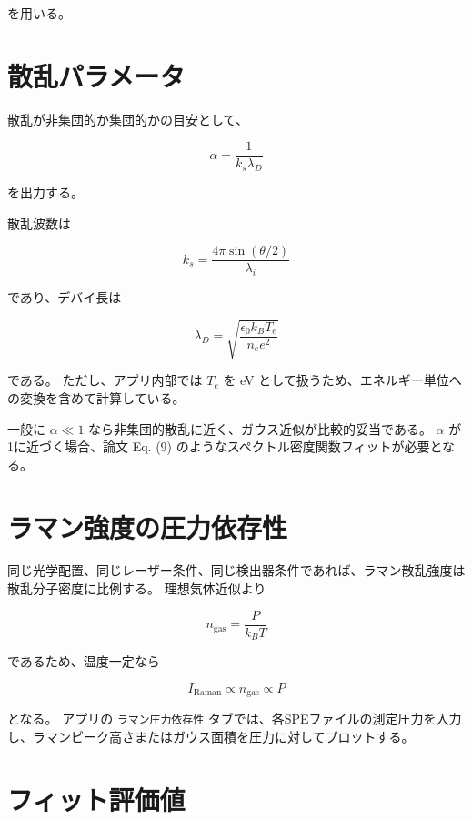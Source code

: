\documentclass[uplatex,dvipdfmx,11pt]{jsarticle}
\begin{document}
を用いる。

\section{散乱パラメータ}

散乱が非集団的か集団的かの目安として、

\begin{equation}
\alpha =
\frac{1}{k_s\lambda_D}
\end{equation}

を出力する。

散乱波数は

\begin{equation}
k_s =
\frac{4\pi\sin(\theta/2)}
{\lambda_i}
\end{equation}

であり、デバイ長は

\begin{equation}
\lambda_D =
\sqrt{
\frac{\epsilon_0 k_B T_e}
{n_e e^2}
}
\end{equation}

である。
ただし、アプリ内部では $T_e$ を \si{eV} として扱うため、エネルギー単位への変換を含めて計算している。

一般に $\alpha\ll1$ なら非集団的散乱に近く、ガウス近似が比較的妥当である。
$\alpha$ が1に近づく場合、論文 Eq. (9) のようなスペクトル密度関数フィットが必要となる。

\section{ラマン強度の圧力依存性}

同じ光学配置、同じレーザー条件、同じ検出器条件であれば、ラマン散乱強度は散乱分子密度に比例する。
理想気体近似より

\begin{equation}
n_{\mathrm{gas}} =
\frac{P}{k_B T}
\end{equation}

であるため、温度一定なら

\begin{equation}
I_{\mathrm{Raman}}
\propto n_{\mathrm{gas}}
\propto P
\end{equation}

となる。
アプリの \texttt{ラマン圧力依存性} タブでは、各SPEファイルの測定圧力を入力し、ラマンピーク高さまたはガウス面積を圧力に対してプロットする。

\section{フィット評価値}
\end{document}
